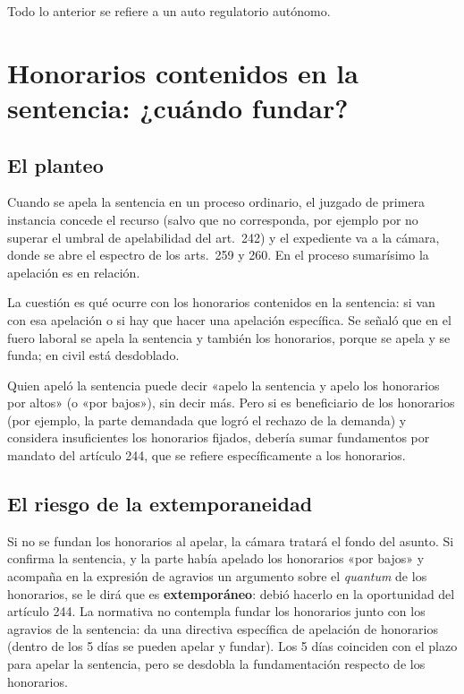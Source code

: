 \documentclass[12pt,oneside]{book}
\begin{document}
Todo lo anterior se refiere a un auto regulatorio autónomo.

\section{Honorarios contenidos en la sentencia: ¿cuándo fundar?}

\subsection{El planteo}

Cuando se apela la sentencia en un proceso ordinario, el juzgado de primera instancia concede el recurso (salvo que no corresponda, por ejemplo por no superar el umbral de apelabilidad del art.~242) y el expediente va a la cámara, donde se abre el espectro de los arts.~259 y 260. En el proceso sumarísimo la apelación es en relación.

La cuestión es qué ocurre con los honorarios contenidos en la sentencia: si van con esa apelación o si hay que hacer una apelación específica. Se señaló que en el fuero laboral se apela la sentencia y también los honorarios, porque se apela y se funda; en civil está desdoblado.

Quien apeló la sentencia puede decir «apelo la sentencia y apelo los honorarios por altos» (o «por bajos»), sin decir más. Pero si es beneficiario de los honorarios (por ejemplo, la parte demandada que logró el rechazo de la demanda) y considera insuficientes los honorarios fijados, debería sumar fundamentos por mandato del artículo 244, que se refiere específicamente a los honorarios.

\subsection{El riesgo de la extemporaneidad}

Si no se fundan los honorarios al apelar, la cámara tratará el fondo del asunto. Si confirma la sentencia, y la parte había apelado los honorarios «por bajos» y acompaña en la expresión de agravios un argumento sobre el \emph{quantum} de los honorarios, se le dirá que es \textbf{extemporáneo}: debió hacerlo en la oportunidad del artículo 244. La normativa no contempla fundar los honorarios junto con los agravios de la sentencia: da una directiva específica de apelación de honorarios (dentro de los 5 días se pueden apelar y fundar). Los 5 días coinciden con el plazo para apelar la sentencia, pero se desdobla la fundamentación respecto de los honorarios.
\end{document}
